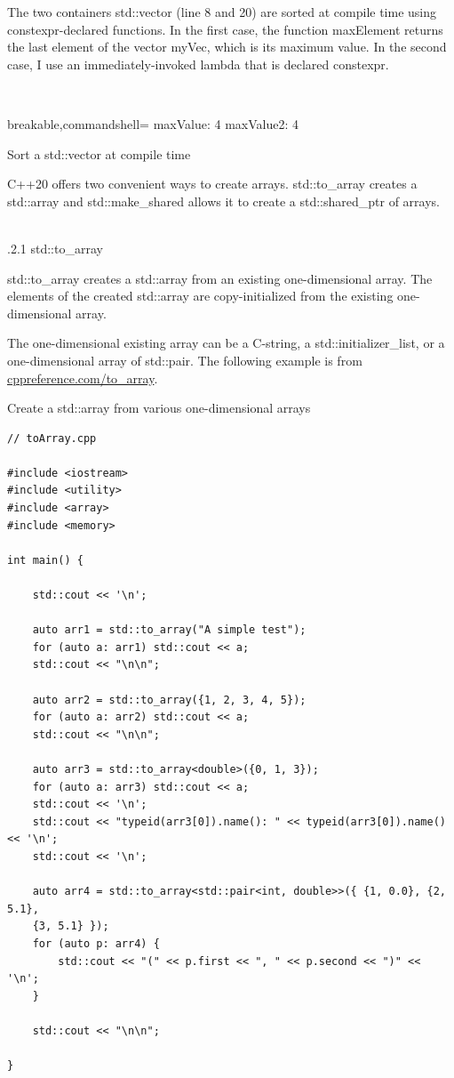 The two containers std::vector (line 8 and 20) are sorted at compile time using constexpr-declared functions. In the first case, the function maxElement returns the last element of the vector myVec, which is its maximum value. In the second case, I use an immediately-invoked lambda that is declared constexpr.

\hspace*{\fill} \\ %
\begin{tcblisting}{breakable,commandshell={}}
maxValue: 4
maxValue2: 4
\end{tcblisting}

\begin{center}
Sort a std::vector at compile time
\end{center}


C++20 offers two convenient ways to create arrays. std::to\_array creates a std::array and std::make\_shared allows it to create a std::shared\_ptr of arrays.

\hspace*{\fill} \\ %
.2.1\hspace{0.2cm} std::to\_array

std::to\_array creates a std::array from an existing one-dimensional array. The elements of the created std::array are copy-initialized from the existing one-dimensional array.

The one-dimensional existing array can be a C-string, a std::initializer\_list, or a one-dimensional array of std::pair. The following example is from \href{https://en.cppreference.com/w/cpp/container/array/to_array}{cppreference.com/to\_array}.

\noindent
Create a std::array from various one-dimensional arrays
\begin{lstlisting}[style=styleCXX]
// toArray.cpp

#include <iostream>
#include <utility>
#include <array>
#include <memory>

int main() {

	std::cout << '\n';
	
	auto arr1 = std::to_array("A simple test");
	for (auto a: arr1) std::cout << a;
	std::cout << "\n\n";
	
	auto arr2 = std::to_array({1, 2, 3, 4, 5});
	for (auto a: arr2) std::cout << a;
	std::cout << "\n\n";
	
	auto arr3 = std::to_array<double>({0, 1, 3});
	for (auto a: arr3) std::cout << a;
	std::cout << '\n';
	std::cout << "typeid(arr3[0]).name(): " << typeid(arr3[0]).name() << '\n';
	std::cout << '\n';
	
	auto arr4 = std::to_array<std::pair<int, double>>({ {1, 0.0}, {2, 5.1},
	{3, 5.1} });
	for (auto p: arr4) {
		std::cout << "(" << p.first << ", " << p.second << ")" << '\n';
	}
	
	std::cout << "\n\n";

}
\end{lstlisting}

